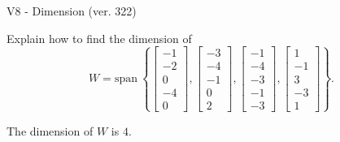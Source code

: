 \begin{exercise}
  \begin{exerciseTitle}V8 - Dimension (ver. 322)\end{exerciseTitle}
  \begin{exerciseStatement}
    Explain how to find the dimension of 
\[W=\mathrm{span}\ \left\{\left[\begin{array}{r}
-1 \\
-2 \\
0 \\
-4 \\
0
\end{array}\right] , \left[\begin{array}{r}
-3 \\
-4 \\
-1 \\
0 \\
2
\end{array}\right] , \left[\begin{array}{r}
-1 \\
-4 \\
-3 \\
-1 \\
-3
\end{array}\right] , \left[\begin{array}{r}
1 \\
-1 \\
3 \\
-3 \\
1
\end{array}\right]\right\}.\]



  \end{exerciseStatement}
  \begin{exerciseAnswer}
   The dimension of \(W\) is  \(4\).
  


  \end{exerciseAnswer}
\end{exercise}